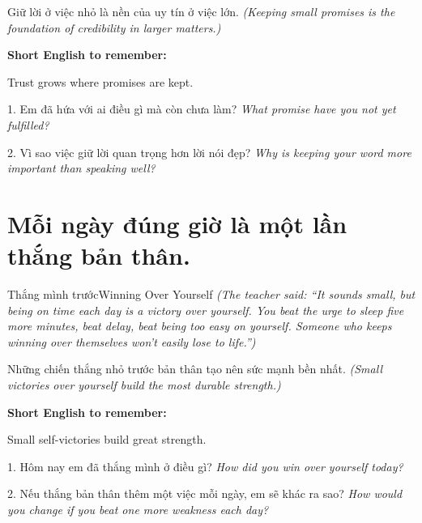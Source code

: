\begin{baihoc}
Giữ lời ở việc nhỏ là nền của uy tín ở việc lớn.
\textit{(Keeping small promises is the foundation of credibility in larger matters.)}
\end{baihoc}

\begin{ghinhoanh}
\textbf{Short English to remember:}

Trust grows where promises are kept.

\end{ghinhoanh}

\begin{tuhocnhanh}
1. Em đã hứa với ai điều gì mà còn chưa làm? \textit{What promise have you not yet fulfilled?}

2. Vì sao việc giữ lời quan trọng hơn lời nói đẹp? \textit{Why is keeping your word more important than speaking well?}
\end{tuhocnhanh}
\ngancach

\section{Mỗi ngày đúng giờ là một lần thắng bản thân.}
\begin{truyen}{Thắng mình trước}{Winning Over Yourself}
\textit{(The teacher said: ``It sounds small, but being on time each day is a victory over yourself. You beat the urge to sleep five more minutes, beat delay, beat being too easy on yourself. Someone who keeps winning over themselves won't easily lose to life.'')}
\end{truyen}

\begin{baihoc}
Những chiến thắng nhỏ trước bản thân tạo nên sức mạnh bền nhất.
\textit{(Small victories over yourself build the most durable strength.)}
\end{baihoc}

\begin{ghinhoanh}
\textbf{Short English to remember:}

Small self-victories build great strength.

\end{ghinhoanh}

\begin{tuhocnhanh}
1. Hôm nay em đã thắng mình ở điều gì? \textit{How did you win over yourself today?}

2. Nếu thắng bản thân thêm một việc mỗi ngày, em sẽ khác ra sao? \textit{How would you change if you beat one more weakness each day?}
\end{tuhocnhanh}
\ngancach

